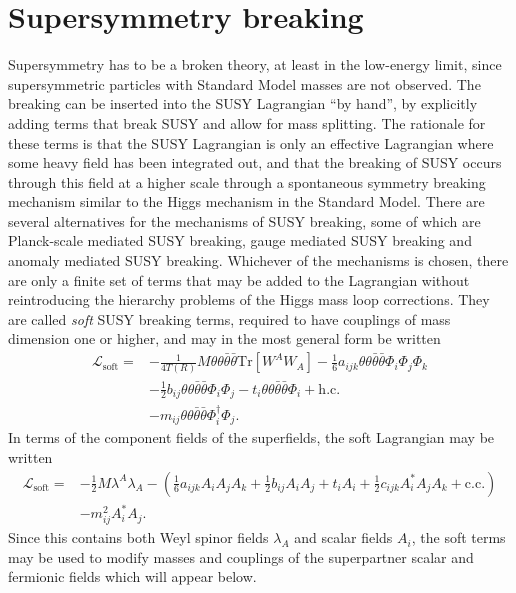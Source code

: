 \documentclass[twoside,english]{uiofysmaster}
\begin{document}
\section{Supersymmetry breaking}
\label{sec:susybreaking}
Supersymmetry has to be a broken theory, at least in the low-energy limit, since supersymmetric particles with Standard Model masses are not observed. The breaking can be inserted into the SUSY Lagrangian ``by hand'', by explicitly adding terms that break SUSY and allow for mass splitting. The rationale for these terms is that the SUSY Lagrangian is only an effective Lagrangian where some heavy field has been integrated out, and that the breaking of SUSY occurs through this field at a higher scale through a spontaneous symmetry breaking mechanism similar to the Higgs mechanism in the Standard Model. There are several alternatives for the mechanisms of SUSY breaking, some of which are Planck-scale mediated SUSY breaking, gauge mediated SUSY breaking and anomaly mediated SUSY breaking. Whichever of the mechanisms is chosen, there are only a finite set of terms that may be added to the Lagrangian without reintroducing the hierarchy problems of the Higgs mass loop corrections. They are called {\it soft} SUSY breaking terms, required to have couplings of mass dimension one or higher, and may in the most general form be written
\begin{align}
	\mathcal{L}_\mathrm{soft} = &-\frac{1}{4T(R)}M\theta\theta\bar\theta\bar\theta \mathrm{Tr} [W^A W_A] - \frac{1}{6}a_{ijk} \theta\theta\bar\theta\bar\theta\Phi_i \Phi_j \Phi_k\nonumber\\
	&-\frac{1}{2}b_{ij} \theta\theta\bar\theta\bar\theta\Phi_i \Phi_j - t_i \theta\theta\bar\theta\bar\theta \Phi_i + \mathrm{h.c.}\\
	&-m_{ij} \theta\theta\bar\theta\bar\theta \Phi_i^\dag \Phi_j.\nonumber
\end{align}
In terms of the component fields of the superfields, the soft Lagrangian may be written
\begin{align}
	\mathcal{L}_\mathrm{soft} = &-\frac{1}{2} M\lambda^A\lambda_A - \left( \frac{1}{6} a_{ijk} A_i A_j A_k + \frac{1}{2} b_{ij} A_i A_j + t_i A_i + \frac{1}{2} c_{ijk} A^*_i A_j A_k + \mathrm{c.c.}\right)\\
	&- m_{ij}^2 A_i^* A_j.\nonumber
\end{align}
Since this contains both Weyl spinor fields $\lambda_A$ and scalar fields $A_i$, the soft terms may be used to modify masses and couplings of the superpartner scalar and fermionic fields which will appear below.
\end{document}
